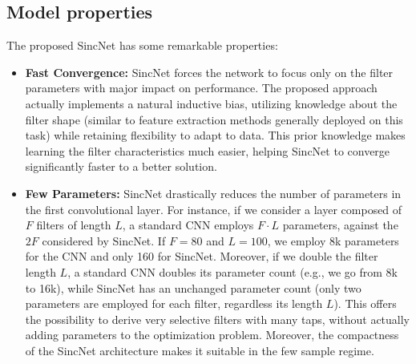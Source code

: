 \documentclass{article}
\begin{document}
\subsection{Model properties}
The proposed SincNet has some remarkable properties:
\begin{itemize}
\item \textbf{Fast Convergence:}
SincNet forces the network to focus only on the filter parameters with major impact on performance. The proposed approach actually implements a natural inductive bias, utilizing knowledge about the filter shape (similar to feature extraction methods generally deployed on this task) while retaining flexibility to adapt to data. This prior knowledge makes learning the filter characteristics much easier, helping SincNet to converge significantly faster to a better solution.

\item \textbf{Few Parameters:} SincNet drastically reduces the number of parameters in the first convolutional layer. %
For instance, if we consider a layer composed of $F$ filters of length $L$, a standard CNN employs $F \cdot L$ parameters, against the $2F$ considered by SincNet. If $F=80$ and $L=100$, we employ 8k parameters for the CNN and only 160 for SincNet. Moreover, if we double the filter length $L$, a standard CNN doubles its parameter count (e.g., we go from 8k to 16k), while SincNet has an unchanged parameter count (only two parameters are employed for each filter, regardless its length $L$). This offers the possibility to derive very selective filters with many taps, without actually adding parameters to the optimization problem. Moreover, the compactness of the SincNet architecture makes it suitable in the few sample regime. 


\end{itemize}
\end{document}
